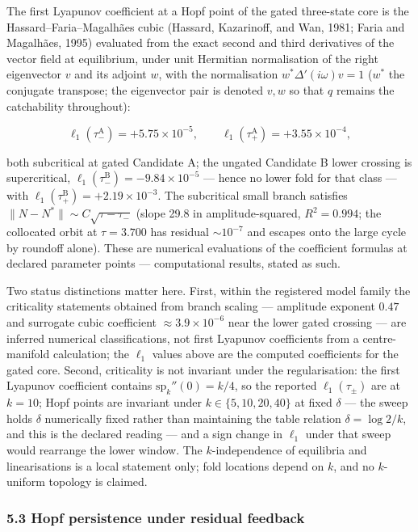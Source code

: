 \documentclass[11pt]{article}
\begin{document}
The first Lyapunov coefficient at a Hopf point of the gated three-state
core is the Hassard--Faria--Magalh\~aes cubic (Hassard, Kazarinoff, and
Wan, 1981; Faria and Magalh\~aes, 1995) evaluated from the exact second
and third derivatives of the vector field at equilibrium, under unit
Hermitian normalisation of the right eigenvector \(v\) and its adjoint
\(w\), with the normalisation \(w^*\Delta'(i\omega)v = 1\) (\(w^*\) the
conjugate transpose; the eigenvector pair is denoted \(v, w\) so that
\(q\) remains the catchability throughout):

\[\ell_1(\tau_-^{\mathrm{A}}) = +5.75\times10^{-5}, \qquad \ell_1(\tau_+^{\mathrm{A}}) = +3.55\times10^{-4},\]

both subcritical at gated Candidate A; the ungated Candidate B lower
crossing is supercritical,
\(\ell_1(\tau_-^{\mathrm{B}}) = -9.84\times10^{-5}\) --- hence no lower
fold for that class --- with
\(\ell_1(\tau_+^{\mathrm{B}}) = +2.19\times10^{-3}\). The subcritical
small branch satisfies \(\|N - N^*\| \sim C\sqrt{\tau - \tau_-}\) (slope
29.8 in amplitude-squared, \(R^2 = 0.994\); the collocated orbit at
\(\tau = 3.700\) has residual \(\sim10^{-7}\) and escapes onto the large
cycle by roundoff alone). These are numerical evaluations of the
coefficient formulas at declared parameter points --- computational
results, stated as such.

Two status distinctions matter here. First, within the registered model
family the criticality statements obtained from branch scaling ---
amplitude exponent \(0.47\) and surrogate cubic coefficient
\(\approx3.9\times10^{-6}\) near the lower gated crossing --- are
inferred numerical classifications, not first Lyapunov coefficients from
a centre-manifold calculation; the \(\ell_1\) values above are the
computed coefficients for the gated core. Second, criticality is not
invariant under the regularisation: the first Lyapunov coefficient
contains \(\mathrm{sp}_k''(0) = k/4\), so the reported
\(\ell_1(\tau_\pm)\) are at \(k = 10\); Hopf points are invariant under
\(k \in \{5, 10, 20, 40\}\) at fixed \(\delta\) --- the sweep holds
\(\delta\) numerically fixed rather than maintaining the table relation
\(\delta = \log 2/k\), and this is the declared reading --- and a sign
change in \(\ell_1\) under that sweep would rearrange the lower window.
The \(k\)-independence of equilibria and linearisations is a local
statement only; fold locations depend on \(k\), and no \(k\)-uniform
topology is claimed.

\subsubsection{5.3 Hopf persistence under residual
feedback}\label{hopf-persistence-under-residual-feedback}
\end{document}
